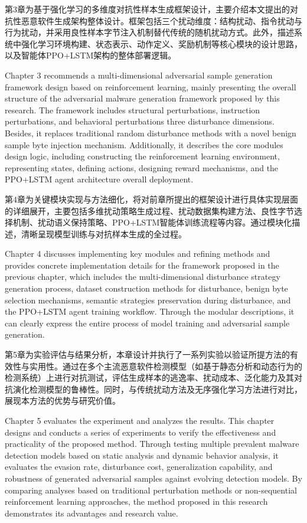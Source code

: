 第3章为基于强化学习的多维度对抗性样本生成框架设计，主要介绍本文提出的对抗性恶意软件生成架构整体设计。框架包括三个扰动维度：结构扰动、指令扰动与行为扰动，并采用良性样本字节注入机制替代传统的随机扰动方式。此外，描述系统中强化学习环境构建、状态表示、动作定义、奖励机制等核心模块的设计思路，以及智能体PPO+LSTM架构的整体部署逻辑。

Chapter 3 recommends a multi-dimensional adversarial sample generation framework design based on reinforcement learning, mainly presenting the overall structure of the adversarial malware generation framework proposed by this research. The framework includes structural perturbations, instruction perturbations, and behavioral perturbations three disturbance dimensions. Besides, it replaces traditional random disturbance methods with a novel benign sample byte injection mechanism. Additionally, it describes the core modules design logic, including constructing the reinforcement learning environment, representing states, defining actions, designing reward mechanisms, and the PPO+LSTM agent architecture overall deployment.

第4章为关键模块实现与方法细化，将对前章所提出的框架设计进行具体实现层面的详细展开，主要包括多维扰动策略生成过程、扰动数据集构建方法、良性字节选择机制、扰动语义保持策略、PPO+LSTM智能体训练流程等内容。通过模块化描述，清晰呈现模型训练与对抗样本生成的全过程。

Chapter 4 discusses implementing key modules and refining methods and provides concrete implementation details for the framework proposed in the previous chapter, which includes the multi-dimensional disturbance strategy generation process, dataset construction methods for disturbance, benign byte selection mechanisms, semantic strategies preservation during disturbance, and the PPO+LSTM agent training workflow. Through the modular descriptions, it can clearly express the entire process of model training and adversarial sample generation.

第5章为实验评估与结果分析，本章设计并执行了一系列实验以验证所提方法的有效性与实用性。通过在多个主流恶意软件检测模型（如基于静态分析和动态行为的检测系统）上进行对抗测试，评估生成样本的逃逸率、扰动成本、泛化能力及其对抗演化检测模型的鲁棒性。同时，与传统扰动方法及无序强化学习方法进行对比，展现本方法的优势与研究价值。

Chapter 5 evaluates the experiment and analyzes the results. This chapter designs and conducts a series of experiments to verify the effectiveness and practicality of the proposed method. Through testing multiple prevalent malware detection models based on static analysis and dynamic behavior analysis, it evaluates the evasion rate, disturbance cost, generalization capability, and robustness of generated adversarial samples against evolving detection models. By comparing analyses based on traditional perturbation methods or non-sequential reinforcement learning approaches, the method proposed in this research demonstrates its advantages and research value.

